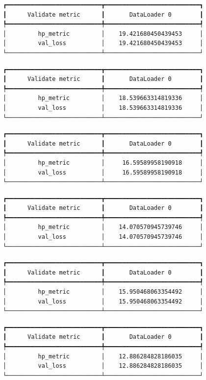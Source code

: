\documentclass[
  letterpaper,
  DIV=11,
  numbers=noendperiod]{scrreprt}
\begin{document}
\begin{verbatim}
┏━━━━━━━━━━━━━━━━━━━━━━━━━━━┳━━━━━━━━━━━━━━━━━━━━━━━━━━━┓
┃      Validate metric      ┃       DataLoader 0        ┃
┡━━━━━━━━━━━━━━━━━━━━━━━━━━━╇━━━━━━━━━━━━━━━━━━━━━━━━━━━┩
│         hp_metric         │    19.421680450439453     │
│         val_loss          │    19.421680450439453     │
└───────────────────────────┴───────────────────────────┘
\end{verbatim}

\begin{verbatim}
┏━━━━━━━━━━━━━━━━━━━━━━━━━━━┳━━━━━━━━━━━━━━━━━━━━━━━━━━━┓
┃      Validate metric      ┃       DataLoader 0        ┃
┡━━━━━━━━━━━━━━━━━━━━━━━━━━━╇━━━━━━━━━━━━━━━━━━━━━━━━━━━┩
│         hp_metric         │    18.539663314819336     │
│         val_loss          │    18.539663314819336     │
└───────────────────────────┴───────────────────────────┘
\end{verbatim}

\begin{verbatim}
┏━━━━━━━━━━━━━━━━━━━━━━━━━━━┳━━━━━━━━━━━━━━━━━━━━━━━━━━━┓
┃      Validate metric      ┃       DataLoader 0        ┃
┡━━━━━━━━━━━━━━━━━━━━━━━━━━━╇━━━━━━━━━━━━━━━━━━━━━━━━━━━┩
│         hp_metric         │     16.59589958190918     │
│         val_loss          │     16.59589958190918     │
└───────────────────────────┴───────────────────────────┘
\end{verbatim}

\begin{verbatim}
┏━━━━━━━━━━━━━━━━━━━━━━━━━━━┳━━━━━━━━━━━━━━━━━━━━━━━━━━━┓
┃      Validate metric      ┃       DataLoader 0        ┃
┡━━━━━━━━━━━━━━━━━━━━━━━━━━━╇━━━━━━━━━━━━━━━━━━━━━━━━━━━┩
│         hp_metric         │    14.070570945739746     │
│         val_loss          │    14.070570945739746     │
└───────────────────────────┴───────────────────────────┘
\end{verbatim}

\begin{verbatim}
┏━━━━━━━━━━━━━━━━━━━━━━━━━━━┳━━━━━━━━━━━━━━━━━━━━━━━━━━━┓
┃      Validate metric      ┃       DataLoader 0        ┃
┡━━━━━━━━━━━━━━━━━━━━━━━━━━━╇━━━━━━━━━━━━━━━━━━━━━━━━━━━┩
│         hp_metric         │    15.950468063354492     │
│         val_loss          │    15.950468063354492     │
└───────────────────────────┴───────────────────────────┘
\end{verbatim}

\begin{verbatim}
┏━━━━━━━━━━━━━━━━━━━━━━━━━━━┳━━━━━━━━━━━━━━━━━━━━━━━━━━━┓
┃      Validate metric      ┃       DataLoader 0        ┃
┡━━━━━━━━━━━━━━━━━━━━━━━━━━━╇━━━━━━━━━━━━━━━━━━━━━━━━━━━┩
│         hp_metric         │    12.886284828186035     │
│         val_loss          │    12.886284828186035     │
└───────────────────────────┴───────────────────────────┘
\end{verbatim}
\end{document}
